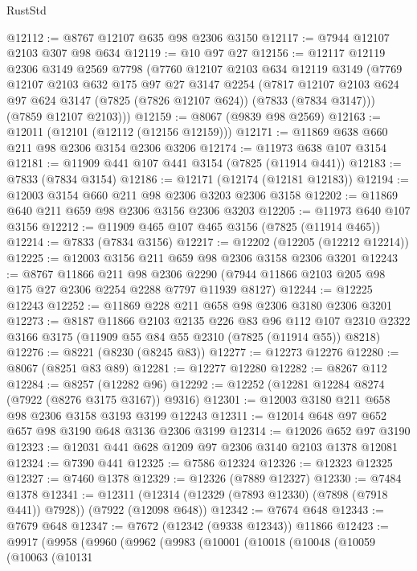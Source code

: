 \begin{lexlean}{RustStd}
\begin{coremodule}
@12112 := @8767 @12107 @635 @98 @2306 @3150
@12117 := @7944 @12107 @2103 @307 @98 @634
@12119 := @10 @97 @27
@12156 := @12117
    @12119
    @2306
    @3149
    @2569
    @7798
    (@7760
      @12107
      @2103
      @634
      @12119
      @3149
      (@7769
        @12107
        @2103
        @632
        @175
        @97
        @27
        @3147
        @2254
        (@7817 @12107 @2103 @624 @97 @624 @3147 (@7825 (@7826 @12107 @624)) (@7833 (@7834 @3147)))
        (@7859 @12107 @2103)))
@12159 := @8067 (@9839 @98 @2569)
@12163 := @12011 (@12101 (@12112 (@12156 @12159)))
@12171 := @11869 @638 @660 @211 @98 @2306 @3154 @2306 @3206
@12174 := @11973 @638 @107 @3154
@12181 := @11909 @441 @107 @441 @3154 (@7825 (@11914 @441))
@12183 := @7833 (@7834 @3154)
@12186 := @12171 (@12174 (@12181 @12183))
@12194 := @12003 @3154 @660 @211 @98 @2306 @3203 @2306 @3158
@12202 := @11869 @640 @211 @659 @98 @2306 @3156 @2306 @3203
@12205 := @11973 @640 @107 @3156
@12212 := @11909 @465 @107 @465 @3156 (@7825 (@11914 @465))
@12214 := @7833 (@7834 @3156)
@12217 := @12202 (@12205 (@12212 @12214))
@12225 := @12003 @3156 @211 @659 @98 @2306 @3158 @2306 @3201
@12243 := @8767
    @11866
    @211
    @98
    @2306
    @2290
    (@7944 @11866 @2103 @205 @98 @175 @27 @2306 @2254 @2288 @7797 @11939 @8127)
@12244 := @12225 @12243
@12252 := @11869 @228 @211 @658 @98 @2306 @3180 @2306 @3201
@12273 := @8187
    @11866
    @2103
    @2135
    @226
    @83
    @96
    @112
    @107
    @2310
    @2322
    @3166
    @3175
    (@11909 @55 @84 @55 @2310 (@7825 (@11914 @55)) @8218)
@12276 := @8221 (@8230 (@8245 @83))
@12277 := @12273 @12276
@12280 := @8067 (@8251 @83 @89)
@12281 := @12277 @12280
@12282 := @8267 @112
@12284 := @8257 (@12282 @96)
@12292 := @12252 (@12281 @12284 @8274 (@7922 (@8276 @3175 @3167)) @9316)
@12301 := @12003 @3180 @211 @658 @98 @2306 @3158 @3193 @3199 @12243
@12311 := @12014 @648 @97 @652 @657 @98 @3190 @648 @3136 @2306 @3199
@12314 := @12026 @652 @97 @3190
@12323 := @12031 @441 @628 @1209 @97 @2306 @3140 @2103 @1378 @12081
@12324 := @7390 @441
@12325 := @7586 @12324
@12326 := @12323 @12325
@12327 := @7460 @1378
@12329 := @12326 (@7889 @12327)
@12330 := @7484 @1378
@12341 := @12311 (@12314 (@12329 (@7893 @12330) (@7898 (@7918 @441)) @7928)) (@7922 (@12098 @648))
@12342 := @7674 @648
@12343 := @7679 @648
@12347 := @7672 (@12342 (@9338 @12343)) @11866
@12423 := @9917
    (@9958
      (@9960
        (@9962
          (@9983
            (@10001
              (@10018
                (@10048
                  (@10059
                    (@10063
                      (@10131

\end{coremodule}
\end{lexlean}
